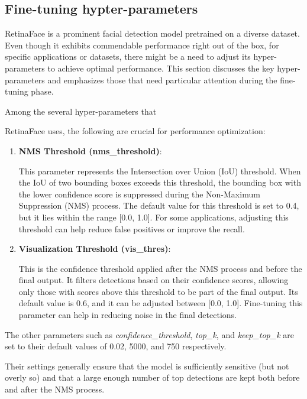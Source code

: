 \documentclass{article}
\begin{document}
\subsection{Fine-tuning hypter-parameters}

RetinaFace is a prominent facial detection model pretrained on a diverse dataset. Even though it exhibits commendable performance right out of the box, for specific applications or datasets, there might be a need to adjust its hyper-parameters to achieve optimal performance. This section discusses the key hyper-parameters and emphasizes those that need particular attention during the fine-tuning phase.

Among the several hyper-parameters that 

RetinaFace uses, the following are crucial for performance optimization:

\begin{enumerate}
    \item \textbf{NMS Threshold (nms\_threshold)}: 
    
    This parameter represents the Intersection over Union (IoU) threshold. When the IoU of two bounding boxes exceeds this threshold, the bounding box with the lower confidence score is suppressed during the Non-Maximum Suppression (NMS) process. The default value for this threshold is set to 0.4, but it lies within the range [0.0, 1.0]. For some applications, adjusting this threshold can help reduce false positives or improve the recall.
    
    \item \textbf{Visualization Threshold (vis\_thres)}: 
    
    This is the confidence threshold applied after the NMS process and before the final output. It filters detections based on their confidence scores, allowing only those with scores above this threshold to be part of the final output. Its default value is 0.6, and it can be adjusted between [0.0, 1.0]. Fine-tuning this parameter can help in reducing noise in the final detections.
\end{enumerate}

The other parameters such as \textit{confidence\_threshold}, \textit{top\_k}, and \textit{keep\_top\_k} are set to their default values of 0.02, 5000, and 750 respectively. 

Their settings generally ensure that the model is sufficiently sensitive (but not overly so) and that a large enough number of top detections are kept both before and after the NMS process.
\end{document}
